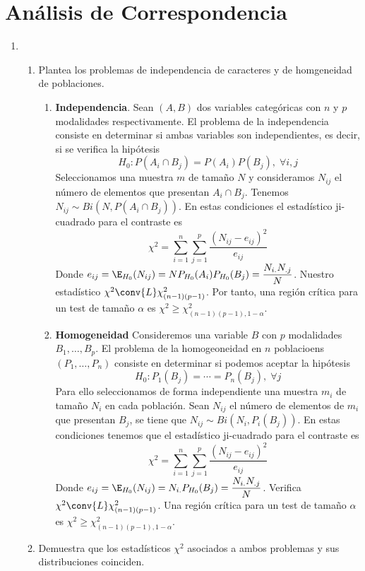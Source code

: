 \documentclass[twoside]{article}
\begin{document}
\section{Análisis de Correspondencia}
\begin{enumerate}
\item 
\begin{enumerate}
\item Plantea los problemas de independencia de caracteres y de homgeneidad de poblaciones.

\begin{enumerate}
\item[] \textbf{Independencia}. Sean $(A,B)$ dos variables categóricas con $n$ y $p$ modalidades respectivamente. El problema de la independencia consiste en determinar si ambas variables son independientes, es decir, si se verifica la hipótesis
$$
H_0\colon P(A_i\cap B_j) = P(A_i)P(B_j), \; \forall i,j
$$
Seleccionamos una muestra $m$ de tamaño $N$ y consideramos $N_{ij}$ el número de elementos que presentan $A_i\cap B_j$. Tenemos $N_{ij}\sim Bi(N,P(A_i\cap B_j))$. En estas condiciones  el estadístico ji-cuadrado para el contraste es
$$
\chi^2 = \sum_{i=1}^n \sum_{j=1}^p \frac{(N_{ij}-e_{ij})^2}{e_{ij}}
$$
Donde $e_{ij} = \E_{H_0}(N_{ij}) = NP_{H_0}(A_i)P_{H_0}(B_j) = \dfrac{N_{i.}N_{.j}}{N}$. Nuestro estadístico $\chi^2 \conv{L}\chi^2_{(n-1)(p-1)}$. Por tanto, una región crítica para un test de tamaño $\alpha$ es $\chi^2 \geq \chi^2_{(n-1)(p-1),1-\alpha}$.
\item[] \textbf{Homogeneidad} Consideremos una variable $B$ con $p$ modalidades $B_1,\dotsc,B_p$. El problema de la homogeoneidad en $n$ poblacioens $(P_1,\dotsc,P_n)$ consiste en determinar si podemos aceptar la hipótesis
$$
H_0\colon P_1(B_j) = \cdots = P_n(B_j),\;\forall j
$$
Para ello seleccionamos de forma independiente una muestra $m_i$ de tamaño $N_i$ en cada población. Sean $N_{ij}$ el número de elementos de $m_i$ que presentan $B_j$, se tiene que $N_{ij}\sim Bi(N_i,P_i(B_j))$. En estas condiciones tenemos que el estadístico ji-cuadrado para el contraste es
$$
\chi^2 = \sum_{i=1}^n \sum_{j=1}^p \frac{(N_{ij}-e_{ij})^2}{e_{ij}}
$$
Donde $e_{ij} = \E_{H_0}(N_{ij}) = N_{i.}P_{H_0}(B_j) = \dfrac{N_{i.}N_{.j}}{N}$. Verifica $\chi^2 \conv{L}\chi^2_{(n-1)(p-1)}$. Una región crítica para un test de tamaño $\alpha$ es $\chi^2 \geq \chi^2_{(n-1)(p-1),1-\alpha}$.
\end{enumerate}

\item Demuestra que los estadísticos $\chi^2$ asociados a ambos problemas y sus distribuciones coinciden.


\end{enumerate}
\end{enumerate}
\end{document}
